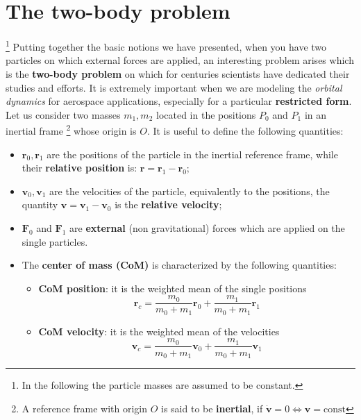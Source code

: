 \section{The two-body problem}\footnote[3]{
    In the following the particle masses are assumed to be constant.
}
Putting together the basic notions we have presented, when you have two particles on which external forces are applied, an interesting problem arises which is the \textbf{two-body problem} on which for centuries scientists have dedicated their studies and efforts. It is extremely important when we are modeling the \textit{orbital dynamics} for aerospace applications, especially for a particular \textbf{restricted form}.\\
Let us consider two masses $m_1, m_2$ located in the positions $P_0$ and $P_1$ in an inertial frame {\footnote[4]{A reference frame with origin $O$ is said to be \textbf{inertial}, if $\dot{\mathbf{v}}=0 \iff \mathbf{v}=\text{const}$}} whose origin is $O$. It is useful to define the following quantities: 
\begin{itemize}
    \itemsep0em
    \item[\ding{202}] $\mathbf{r}_0, \mathbf{r}_1$ are the positions of the particle in the inertial reference frame, while their \textbf{relative position} is: $\mathbf{r}=\mathbf{r}_1-\mathbf{r}_0$;
    \item[\ding{203}]  $\mathbf{v}_0, \mathbf{v}_1$ are the velocities of the particle, equivalently to the positions, the quantity $\mathbf{v}=\mathbf{v}_1-\mathbf{v}_0$ is the \textbf{relative velocity}; 
    \item[\ding{204}] $\mathbf{F}_0$ and $\mathbf{F}_1$ are \textbf{external} (non gravitational) forces which are applied on the single particles.
    \item[\ding{205}] The \textbf{center of mass (CoM)} is characterized by the following quantities:
    \begin{itemize}
        \itemsep0em
        \item[\ding{52}] \textbf{CoM position}: it is the weighted mean of the single positions $$\mathbf{r}_c= \frac{m_0}{m_0+m_1} \mathbf{r}_0 + \frac{m_1}{m_0+m_1} \mathbf{r}_1$$ 
        \item[\ding{52}] \textbf{CoM velocity}: it is the weighted mean of the velocities
        $$
        \mathbf{v}_c = \frac{m_0}{m_0+m_1} \mathbf{v}_0+ \frac{m_1}{m_0+m_1} \mathbf{v}_1
        $$
    \end{itemize} 
\end{itemize}

